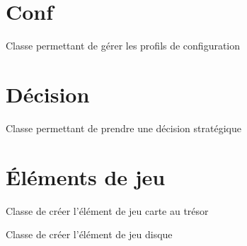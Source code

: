 \documentclass[letterpaper,10pt,french]{sphinxmanual}
\begin{document}
\chapter{Conf}
\label{conf::doc}\label{conf:module-lib.conf}\label{conf:conf}

\begin{fulllineitems}
\label{conf:lib.conf.Conf}
Classe permettant de gérer les profils de configuration

\end{fulllineitems}



\chapter{Décision}
\label{decision:module-lib.decision}\label{decision:decision}\label{decision::doc}

\begin{fulllineitems}
\label{decision:lib.decision.Decision}
Classe permettant de prendre une décision stratégique

\end{fulllineitems}



\chapter{Éléments de jeu}
\label{elements_jeu:elements-de-jeu}\label{elements_jeu::doc}\label{elements_jeu:module-lib.elements_jeu}

\begin{fulllineitems}
\label{elements_jeu:lib.elements_jeu.Carte_tresor}
Classe de créer l'élément de jeu carte au trésor

\end{fulllineitems}


\begin{fulllineitems}
\label{elements_jeu:lib.elements_jeu.Disque}
Classe de créer l'élément de jeu disque

\end{fulllineitems}
\end{document}

